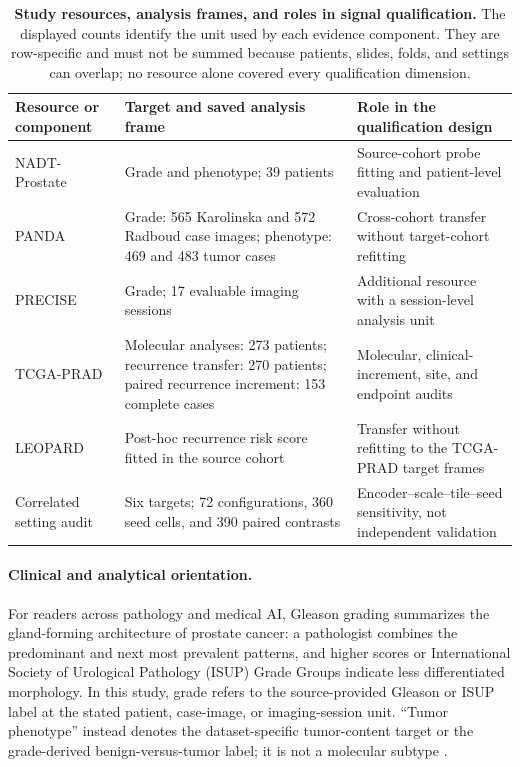 \begin{table}[!htbp]
\centering
\small
\setlength{\tabcolsep}{4pt}
\renewcommand{\arraystretch}{1.15}
\caption*{\textbf{Study resources, analysis frames, and roles in signal qualification.}
The displayed counts identify the unit used by each evidence component. They are
row-specific and must not be summed because patients, slides, folds, and settings can
overlap; no resource alone covered every qualification dimension.}
\begin{tabular}{@{}p{}p{}p{}@{}}
\toprule
Resource or component & Target and saved analysis frame & Role in the qualification design \\
\midrule
NADT-Prostate \cite{nadt2021} & Grade and phenotype; 39 patients & Source-cohort probe
fitting and patient-level evaluation \\
PANDA \cite{panda2022} & Grade: 565 Karolinska and 572 Radboud case images; phenotype:
469 and 483 tumor cases & Cross-cohort transfer without target-cohort refitting \\
PRECISE \cite{precise2026} & Grade; 17 evaluable imaging sessions & Additional resource
with a session-level analysis unit \\
TCGA-PRAD \cite{tcgaprad2015,tcgacdr2018} & Molecular analyses: 273 patients; recurrence
transfer: 270 patients; paired recurrence increment: 153 complete cases & Molecular,
clinical-increment, site, and endpoint audits \\
LEOPARD \cite{leopard2026} & Post-hoc recurrence risk score fitted in the source cohort &
Transfer without refitting to the TCGA-PRAD target frames \\
Correlated setting audit & Six targets; 72 configurations, 360 seed cells, and 390 paired
contrasts & Encoder--scale--tile--seed sensitivity, not independent validation \\
\bottomrule
\end{tabular}
\end{table}

\paragraph{Clinical and analytical orientation.}
For readers across pathology and medical AI, Gleason grading summarizes the gland-forming
architecture of prostate cancer: a pathologist combines the predominant and next most
prevalent patterns, and higher scores or International Society of Urological Pathology
(ISUP) Grade Groups indicate less differentiated morphology. In this study, grade refers to
the source-provided Gleason or ISUP label at the stated patient, case-image, or imaging-session
unit. ``Tumor phenotype'' instead denotes the dataset-specific tumor-content target or the
grade-derived benign-versus-tumor label; it is not a molecular subtype
\cite{panda2022}.

